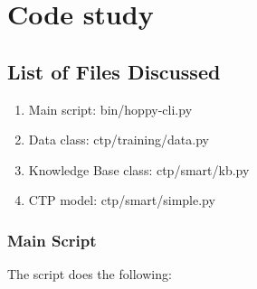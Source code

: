 \documentclass[Other]{iitddiss}
\begin{document}
\chapter{Code study}
\section{List of Files Discussed}
\begin{enumerate}
\item Main script: bin/hoppy-cli.py
\item Data class: ctp/training/data.py
\item Knowledge Base class: ctp/smart/kb.py
\item CTP model: ctp/smart/simple.py
\end{enumerate}

\subsection{Main Script}
The script does the following:
\end{document}

